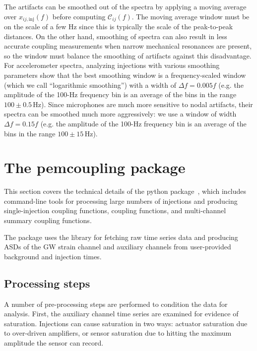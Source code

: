 The artifacts can be smoothed out of the spectra by applying a moving average over $x_{ij,\mathrm{inj}}(f)$ before computing $\mathcal{C}_{ij}(f)$.
The moving average window must be on the scale of a few Hz since this is typically the scale of the peak-to-peak distances.
On the other hand, smoothing of spectra can also result in less accurate coupling measurements when narrow mechanical resonances are present, so the window must balance the smoothing of artifacts against this disadvantage.
For accelerometer spectra, analyzing injections with various smoothing parameters show that the best smoothing window is a frequency-scaled window (which we call ``logarithmic smoothing'') with a width of $\Delta f = 0.005 f$ (e.g. the amplitude of the 100-Hz frequency bin is an average of the bins in the range $100 \pm 0.5$\,Hz).
Since microphones are much more sensitive to nodal artifacts, their spectra can be smoothed much more aggressively: we use a window of width $\Delta f = 0.15 f$ (e.g. the amplitude of the 100-Hz frequency bin is an average of the bins in the range $100 \pm 15$\,Hz).


\section{The {\selectfont pemcoupling}\xspace package}
\label{sec:pemcoupling}

This section covers the technical details of the \pemcoupling python package~\citep{pem_code}, which includes command-line tools for processing large numbers of injections and producing single-injection coupling functions, coupling functions, and multi-channel summary coupling functions.

The package uses the  library for fetching raw time series data and producing \acp{ASD} of the \ac{GW} strain channel and auxiliary channels from user-provided background and injection times.

\subsection{Processing steps}

A number of pre-processing steps are performed to condition the data for analysis.
First, the auxiliary channel time series are examined for evidence of saturation.
Injections can cause saturation in two ways: actuator saturation due to over-driven amplifiers, or sensor saturation due to hitting the maximum amplitude the sensor can record.


